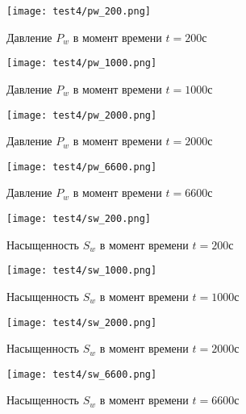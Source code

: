 \begin{figure}
\centering
    \begin{minipage}[!ht]{0.49\textwidth}
       \texttt{[image: test4/pw\_200.png]}
       \vspace{1cm}
       \caption{Давление $P_w$ в момент времени $t=200$с}
       \label{t4_pic_start}
    \end{minipage}
    \hfill
    \begin{minipage}[!ht]{0.49\textwidth}
       \texttt{[image: test4/pw\_1000.png]}
       \vspace{1cm}
       \caption{Давление $P_w$ в момент времени $t=1000$с}
    \end{minipage}
    \vspace{3cm}
    \vfill
    \begin{minipage}[!ht]{0.49\textwidth}
       \texttt{[image: test4/pw\_2000.png]}
       \vspace{1cm}
       \caption{Давление $P_w$ в момент времени $t=2000$с}
    \end{minipage}
    \hfill
    \begin{minipage}[!ht]{0.49\textwidth}
       \texttt{[image: test4/pw\_6600.png]}
       \vspace{1cm}
       \caption{Давление $P_w$ в момент времени $t=6600$с}
    \end{minipage}
    \hfill
\end{figure}

\begin{figure}
\centering
    \begin{minipage}[!ht]{0.49\textwidth}
       \texttt{[image: test4/sw\_200.png]}
       \vspace{1cm}
       \caption{Насыщенность $S_w$ в момент времени $t=200$с}
    \end{minipage}
    \hfill
    \begin{minipage}[!ht]{0.49\textwidth}
       \texttt{[image: test4/sw\_1000.png]}
       \vspace{1cm}
       \caption{Насыщенность $S_w$ в момент времени $t=1000$с}
    \end{minipage}
    \vspace{3cm}
    \vfill
    \begin{minipage}[!ht]{0.49\textwidth}
       \texttt{[image: test4/sw\_2000.png]}
       \vspace{1cm}
       \caption{Насыщенность $S_w$ в момент времени $t=2000$с}
    \end{minipage}
    \hfill
    \begin{minipage}[!ht]{0.49\textwidth}
       \texttt{[image: test4/sw\_6600.png]}
       \vspace{1cm}
       \caption{Насыщенность $S_w$ в момент времени $t=6600$с}
    \end{minipage}
    \hfill
\end{figure}

